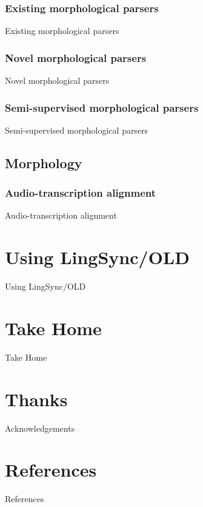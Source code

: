 \documentclass{beamer}
\begin{document}
\subsubsection[Existing]{Existing morphological parsers}

\begin{frame}
Existing morphological parsers
\end{frame}


\subsubsection[Novel]{Novel morphological parsers}

\begin{frame}
Novel morphological parsers
\end{frame}

\subsubsection[Statistical]{Semi-supervised morphological parsers}

\begin{frame}
Semi-supervised morphological parsers
\end{frame}

\subsection{Morphology}

\subsubsection[Audio]{Audio-transcription alignment}

\begin{frame}
Audio-transcription alignment
\end{frame}

\section[CompLinguists]{Using LingSync/OLD}\label{open-data}

\begin{frame}
Using LingSync/OLD
\end{frame}

\section{Take Home}

\begin{frame}
Take Home
\end{frame}

\section*{Thanks}

\begin{frame}
Acknowledgements
\end{frame}


\section*{References}

\begin{frame}
References
\end{frame}
\end{document}
